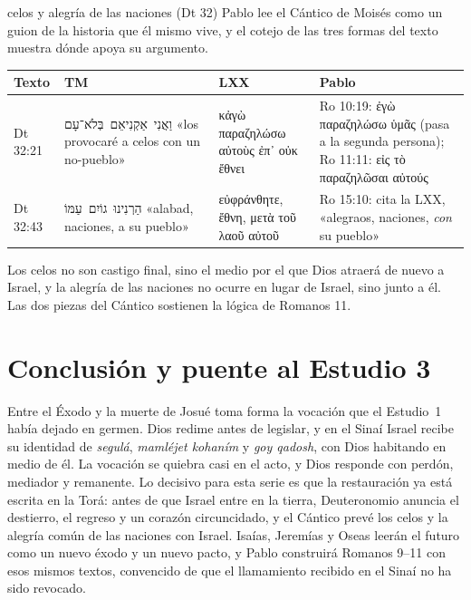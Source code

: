 \documentclass[11pt,letterpaper]{article}
\newcommand{\heb}[1]{\mbox{\foreignlanguage{hebrew}{#1}}}
\newcommand{\grc}[1]{\foreignlanguage{ancientgreek}{#1}}
\begin{document}
\begin{perla}{celos y alegría de las naciones (Dt 32)}
Pablo lee el Cántico de Moisés como un guion de la historia que él mismo vive, y el cotejo de las tres formas del texto muestra dónde apoya su argumento.\par\smallskip
{\centering\renewcommand{\arraystretch}{1.18}
\begin{tabular}{>{\RaggedRight\arraybackslash}p{1.5cm}>{\RaggedRight\arraybackslash}p{4.3cm}>{\RaggedRight\arraybackslash}p{3.9cm}>{\RaggedRight\arraybackslash}p{4.2cm}}
\toprule
\textbf{Texto} & \textbf{TM} & \textbf{LXX} & \textbf{Pablo}\\
\midrule
Dt 32:21 & \heb{וַאֲנִי אַקְנִיאֵם בְּלֹא־עָם} «los provocaré a celos con un no-pueblo» & \grc{κἀγὼ παραζηλώσω αὐτοὺς ἐπ᾽ οὐκ ἔθνει} & Ro 10:19: \grc{ἐγὼ παραζηλώσω ὑμᾶς} (pasa a la segunda persona); Ro 11:11: \grc{εἰς τὸ παραζηλῶσαι αὐτούς}\\
Dt 32:43 & \heb{הַרְנִינוּ גוֹיִם עַמּוֹ} «alabad, naciones, a su pueblo» & \grc{εὐφράνθητε, ἔθνη, μετὰ τοῦ λαοῦ αὐτοῦ} & Ro 15:10: cita la LXX, «alegraos, naciones, \emph{con} su pueblo»\\
\bottomrule
\end{tabular}\par}
\smallskip
Los celos no son castigo final, sino el medio por el que Dios atraerá de nuevo a Israel, y la alegría de las naciones no ocurre en lugar de Israel, sino junto a él. Las dos piezas del Cántico sostienen la lógica de Romanos 11.
\end{perla}

\section{Conclusión y puente al Estudio 3}

Entre el Éxodo y la muerte de Josué toma forma la vocación que el Estudio~1 había dejado en germen. Dios redime antes de legislar, y en el Sinaí Israel recibe su identidad de \emph{segulá}, \emph{mamléjet kohaním} y \emph{goy qadosh}, con Dios habitando en medio de él. La vocación se quiebra casi en el acto, y Dios responde con perdón, mediador y remanente. Lo decisivo para esta serie es que la restauración ya está escrita en la Torá: antes de que Israel entre en la tierra, Deuteronomio anuncia el destierro, el regreso y un corazón circuncidado, y el Cántico prevé los celos y la alegría común de las naciones con Israel. Isaías, Jeremías y Oseas leerán el futuro como un nuevo éxodo y un nuevo pacto, y Pablo construirá Romanos 9–11 con esos mismos textos, convencido de que el llamamiento recibido en el Sinaí no ha sido revocado.
\end{document}
